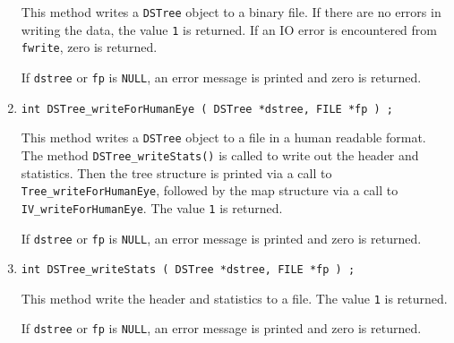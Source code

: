 \begin{enumerate}
This method writes a {\tt DSTree} object to a binary file.
If there are no errors in writing the data, 
the value {\tt 1} is returned.
If an IO error is encountered from {\tt fwrite}, zero is returned.
\par {}
If {\tt dstree} or {\tt fp} is {\tt NULL}, 
an error message is printed and zero is returned.
\item
\begin{verbatim}
int DSTree_writeForHumanEye ( DSTree *dstree, FILE *fp ) ;
\end{verbatim}
\par
This method writes a {\tt DSTree} object to a file in a human
readable format.
The method {\tt DSTree\_writeStats()} is called to write out the
header and statistics. 
Then the tree structure is printed via a call to
{\tt Tree\_writeForHumanEye}, followed by the map structure via a
call to
{\tt IV\_writeForHumanEye}.
The value {\tt 1} is returned.
\par {}
If {\tt dstree} or {\tt fp} is {\tt NULL}, 
an error message is printed and zero is returned.
\item
\begin{verbatim}
int DSTree_writeStats ( DSTree *dstree, FILE *fp ) ;
\end{verbatim}
\par
This method write the header and statistics to a file.
The value {\tt 1} is returned.
\par {}
If {\tt dstree} or {\tt fp} is {\tt NULL}, 
an error message is printed and zero is returned.
\end{enumerate}

